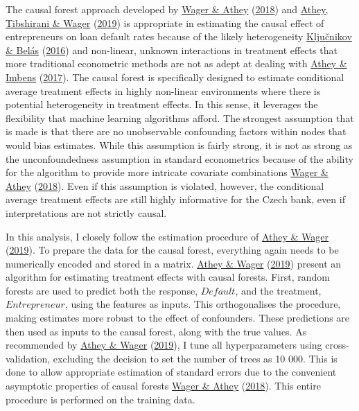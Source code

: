 \documentclass[11pt,preprint, authoryear]{elsarticle}
\numberwithin{equation}{section}
\numberwithin{figure}{section}
\numberwithin{table}{section}
\begin{document}
The causal forest approach developed by
\protect\hyperlink{ref-AtheyASA2018}{Wager \& Athey}
(\protect\hyperlink{ref-AtheyASA2018}{2018}) and
\protect\hyperlink{ref-AtheyGRF2019}{Athey, Tibshirani \& Wager}
(\protect\hyperlink{ref-AtheyGRF2019}{2019}) is appropriate in
estimating the causal effect of entrepreneurs on loan default rates
because of the likely heterogeneity
\protect\hyperlink{ref-Entrep}{Ključnikov \& Belás}
(\protect\hyperlink{ref-Entrep}{2016}) and non-linear, unknown
interactions in treatment effects that more traditional econometric
methods are not as adept at dealing with
\protect\hyperlink{ref-StateOfEconometrics}{Athey \& Imbens}
(\protect\hyperlink{ref-StateOfEconometrics}{2017}). The causal forest
is specifically designed to estimate conditional average treatment
effects in highly non-linear environments where there is potential
heterogeneity in treatment effects. In this sense, it leverages the
flexibility that machine learning algorithms afford. The strongest
assumption that is made is that there are no unobservable confounding
factors within nodes that would bias estimates. While this assumption is
fairly strong, it is not as strong as the unconfoundedness assumption in
standard econometrics because of the ability for the algorithm to
provide more intricate covariate combinations
\protect\hyperlink{ref-AtheyASA2018}{Wager \& Athey}
(\protect\hyperlink{ref-AtheyASA2018}{2018}). Even if this assumption is
violated, however, the conditional average treatment effects are still
highly informative for the Czech bank, even if interpretations are not
strictly causal.

In this analysis, I closely follow the estimation procedure of
\protect\hyperlink{ref-Athey2019Application}{Athey \& Wager}
(\protect\hyperlink{ref-Athey2019Application}{2019}). To prepare the
data for the causal forest, everything again needs to be numerically
encoded and stored in a matrix.
\protect\hyperlink{ref-Athey2019Application}{Athey \& Wager}
(\protect\hyperlink{ref-Athey2019Application}{2019}) present an
algorithm for estimating treatment effects with causal forests. First,
random forests are used to predict both the response, \(Default\), and
the treatment, \(Entrepreneur\), using the features as inputs. This
orthogonalises the procedure, making estimates more robust to the effect
of confounders. These predictions are then used as inputs to the causal
forest, along with the true values. As recommended by
\protect\hyperlink{ref-Athey2019Application}{Athey \& Wager}
(\protect\hyperlink{ref-Athey2019Application}{2019}), I tune all
hyperparameters using cross-validation, excluding the decision to set
the number of trees as 10 000. This is done to allow appropriate
estimation of standard errors due to the convenient asymptotic
properties of causal forests \protect\hyperlink{ref-AtheyASA2018}{Wager
\& Athey} (\protect\hyperlink{ref-AtheyASA2018}{2018}). This entire
procedure is performed on the training data.
\end{document}
